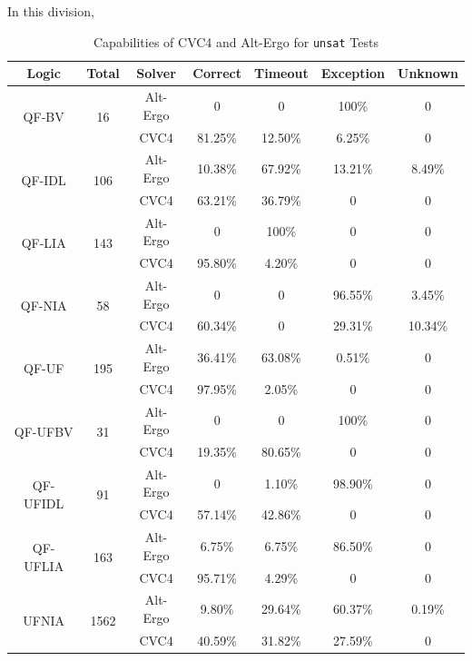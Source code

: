 \documentclass[10pt,twocolumn,letter]{article}
\theoremstyle{definition}
\begin{document}
In this division, 


\begin{table}[!ht]
\small
\centering
\begin{tabular}{|cc|c|cccc|}
\hline
  Logic & Total & Solver & Correct & Timeout & Exception & Unknown\\\hline
  \multirow{2}{*}{QF-BV} & \multirow{2}{*}{16} & Alt-Ergo & 0 & 0 & 100\% & 0\\
  & & CVC4 & 81.25\% & 12.50\% & 6.25\% & 0\\\hline
  \multirow{2}{*}{QF-IDL} & \multirow{2}{*}{106} & Alt-Ergo & 10.38\% & 67.92\% & 13.21\% & 8.49\%\\
  &  & CVC4 & 63.21\% & 36.79\% & 0 & 0\\\hline
  \multirow{2}{*}{QF-LIA} & \multirow{2}{*}{143} & Alt-Ergo & 0 & 100\% & 0 & 0\\
  &  & CVC4 & 95.80\% & 4.20\% & 0 & 0\\\hline
  \multirow{2}{*}{QF-NIA} & \multirow{2}{*}{58} & Alt-Ergo & 0 & 0 & 96.55\% & 3.45\%\\
  &  & CVC4 & 60.34\% & 0 & 29.31\% & 10.34\%\\\hline
  \multirow{2}{*}{QF-UF} & \multirow{2}{*}{195} & Alt-Ergo & 36.41\% & 63.08\% & 0.51\% & 0\\
  &  & CVC4 & 97.95\% & 2.05\% & 0 & 0\\\hline
  \multirow{2}{*}{QF-UFBV} & \multirow{2}{*}{31} & Alt-Ergo & 0 & 0 & 100\% & 0\\
  &  & CVC4 & 19.35\% & 80.65\% & 0 & 0\\\hline
  \multirow{2}{*}{QF-UFIDL} & \multirow{2}{*}{91} & Alt-Ergo & 0 & 1.10\% & 98.90\% & 0\\
  &  & CVC4 & 57.14\% & 42.86\% & 0 & 0\\\hline
  \multirow{2}{*}{QF-UFLIA} & \multirow{2}{*}{163} & Alt-Ergo & 6.75\% & 6.75\% & 86.50\% & 0\\
  &  & CVC4 & 95.71\% & 4.29\% & 0 & 0\\\hline
  \multirow{2}{*}{UFNIA} & \multirow{2}{*}{1562} & Alt-Ergo & 9.80\% & 29.64\% & 60.37\% & 0.19\%\\
  &  & CVC4 & 40.59\% & 31.82\% & 27.59\% & 0\\\hline
\end{tabular}
\caption{Capabilities of CVC4 and Alt-Ergo for {\tt unsat} Tests}
\label{t:result}
\end{table}
\end{document}
